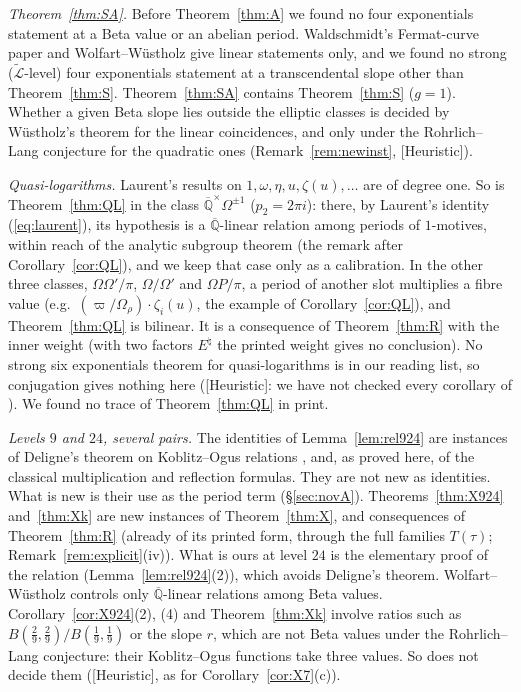 \documentclass[11pt]{amsart}
\theoremstyle{definition}
\newcommand{\Qb}{\overline{\mathbb{Q}}}
\newcommand{\Lt}{\widetilde{\mathcal{L}}}
\newcommand{\vp}{\varpi}
\newcommand{\lab}[1]{\textup{[#1]}}
\begin{document}
\emph{Theorem~\ref{thm:SA}.} Before Theorem~\ref{thm:A} we found no four exponentials statement at a Beta value or an abelian
period. Waldschmidt's Fermat-curve paper \cite{Wfermat82} and Wolfart--W\"ustholz \cite{WW85} give linear statements only,
and we found no strong ($\Lt$-level) four exponentials statement at a transcendental slope other than Theorem~\ref{thm:S}.
Theorem~\ref{thm:SA} contains Theorem~\ref{thm:S} ($g=1$). Whether a given Beta slope lies outside the elliptic classes is
decided by W\"ustholz's theorem for the linear coincidences, and only under the Rohrlich--Lang conjecture for the quadratic
ones (Remark~\ref{rem:newinst}, \lab{Heuristic}).

\emph{Quasi-logarithms.} Laurent's results \cite{La82} on $1,\omega,\eta,u,\zeta(u),\dots$ are of degree one. So is
Theorem~\ref{thm:QL} in the class $\Qb^\times\Omega^{\pm1}$ ($p_2=2\pi i$): there, by Laurent's identity
(\ref{eq:laurent}), its hypothesis is a $\Qb$-linear relation among periods of $1$-motives, within reach of the analytic
subgroup theorem (the remark after Corollary~\ref{cor:QL}), and we keep that case only as a calibration. In the other three
classes, $\Omega\Omega'/\pi$, $\Omega/\Omega'$ and $\Omega P/\pi$, a period of another slot multiplies a fibre value (e.g.\
$(\vp/\Omega_\rho)\cdot\zeta_i(u)$, the example of Corollary~\ref{cor:QL}), and Theorem~\ref{thm:QL} is bilinear. It is a
consequence of Theorem~\ref{thm:R} with the inner weight (with two factors $E^\natural$ the printed weight gives no
conclusion). No strong six exponentials theorem for quasi-logarithms is in our
reading list, so conjugation gives nothing here (\lab{Heuristic}: we have not checked every corollary of \cite{RW93}). We
found no trace of Theorem~\ref{thm:QL} in print.

\emph{Levels $9$ and $24$, several pairs.} The identities of Lemma~\ref{lem:rel924} are instances of Deligne's theorem on
Koblitz--Ogus relations \cite{De82,KO79}, and, as proved here, of the classical multiplication and reflection formulas. They
are not new as identities. What is new is their use as the period term (\S\ref{sec:novA}). Theorems~\ref{thm:X924}
and~\ref{thm:Xk} are new instances of Theorem~\ref{thm:X}, and consequences of Theorem~\ref{thm:R} (already of its printed
form, through the full families $T(\tau)$; Remark~\ref{rem:explicit}(iv)). What is ours at level $24$ is the elementary proof of the relation
(Lemma~\ref{lem:rel924}(2)), which avoids Deligne's theorem. Wolfart--W\"ustholz \cite{WW85} controls only $\Qb$-linear
relations among Beta values. Corollary~\ref{cor:X924}(2), (4) and Theorem~\ref{thm:Xk} involve ratios such as
$B(\frac29,\frac29)/B(\frac19,\frac19)$ or the slope $r$, which are not Beta values under the Rohrlich--Lang conjecture: their
Koblitz--Ogus functions take three values. So \cite{WW85} does not decide them (\lab{Heuristic}, as for
Corollary~\ref{cor:X7}(c)).
\end{document}
